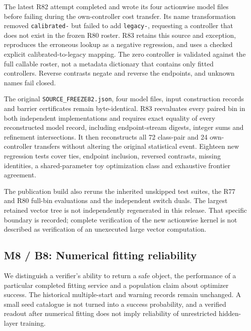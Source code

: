\documentclass[ecta,nameyear,draft]{econsocart}
\begin{document}
The latest R82 attempt completed and wrote its four actionwise model
files before failing during the own-controller cost transfer. Its name
transformation removed \nolinkurl{calibrated-} but failed to add
\nolinkurl{legacy-}, requesting a controller that does not exist in the
frozen R80 roster. R83 retains this source and exception, reproduces the
erroneous lookup as a negative regression, and uses a checked explicit
calibrated-to-legacy mapping. The zero controller is validated against
the full callable roster, not a metadata dictionary that contains only
fitted controllers. Reverse contrasts negate and reverse the endpoints,
and unknown names fail closed.

The original \nolinkurl{SOURCE_FREEZE82.json}, four model files, input
construction records and barrier certificates remain byte-identical. R83
reevaluates every paired bin in both independent implementations and
requires exact equality of every reconstructed model record, including
endpoint-stream digests, integer sums and refinement intersections. It
then reconstructs all 72 class-pair and 24 own-controller transfers
without altering the original statistical event. Eighteen new regression
tests cover ties, endpoint inclusion, reversed contrasts, missing
identities, a shared-parameter toy optimization class and exhaustive
frontier agreement.

The publication build also reruns the inherited unskipped test suites,
the R77 and R80 full-bin evaluations and the independent switch duals.
The largest retained vector tree is not independently regenerated in
this release. That specific boundary is recorded; complete verification
of the new actionwise kernel is not described as verification of an
unexecuted large vector computation.

\hypertarget{m8-b8-numerical-fitting-reliability}{%
\subsection{M8 / B8: Numerical fitting
reliability}\label{m8-b8-numerical-fitting-reliability}}

We distinguish a verifier's ability to return a safe object, the
performance of a particular completed fitting service and a population
claim about optimizer success. The historical multiple-start and warning
records remain unchanged. A small seed catalogue is not turned into a
success probability, and a verified readout after numerical fitting does
not imply reliability of unrestricted hidden-layer training.
\end{document}

